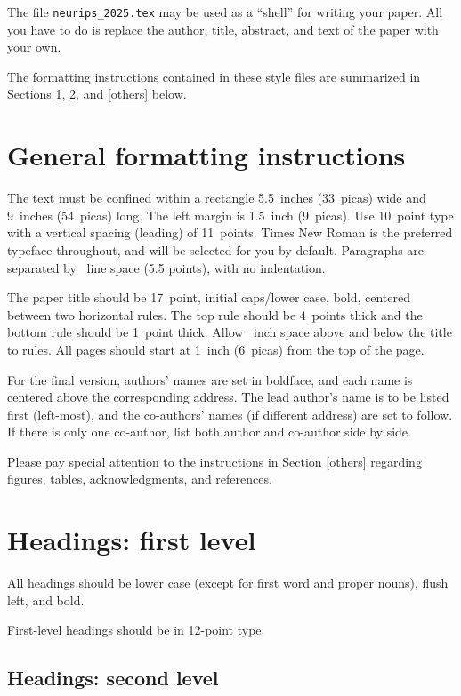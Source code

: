 \documentclass{article}
\begin{document}
The file \verb+neurips_2025.tex+ may be used as a ``shell'' for writing your
paper. All you have to do is replace the author, title, abstract, and text of
the paper with your own.


The formatting instructions contained in these style files are summarized in
Sections \ref{gen_inst}, \ref{headings}, and \ref{others} below.


\section{General formatting instructions}
\label{gen_inst}


The text must be confined within a rectangle 5.5~inches (33~picas) wide and
9~inches (54~picas) long. The left margin is 1.5~inch (9~picas).  Use 10~point
type with a vertical spacing (leading) of 11~points.  Times New Roman is the
preferred typeface throughout, and will be selected for you by default.
Paragraphs are separated by ~line space (5.5 points), with no
indentation.


The paper title should be 17~point, initial caps/lower case, bold, centered
between two horizontal rules. The top rule should be 4~points thick and the
bottom rule should be 1~point thick. Allow ~inch space above and
below the title to rules. All pages should start at 1~inch (6~picas) from the
top of the page.


For the final version, authors' names are set in boldface, and each name is
centered above the corresponding address. The lead author's name is to be listed
first (left-most), and the co-authors' names (if different address) are set to
follow. If there is only one co-author, list both author and co-author side by
side.


Please pay special attention to the instructions in Section \ref{others}
regarding figures, tables, acknowledgments, and references.

\section{Headings: first level}
\label{headings}


All headings should be lower case (except for first word and proper nouns),
flush left, and bold.


First-level headings should be in 12-point type.


\subsection{Headings: second level}
\end{document}
